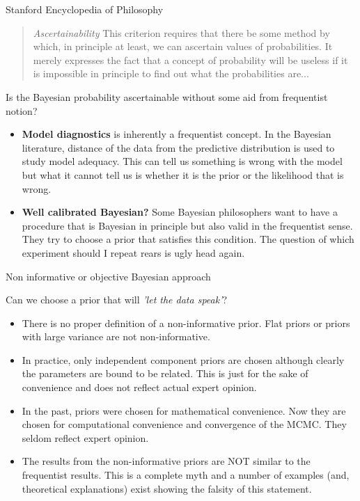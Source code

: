 \documentclass[10pt]{beamer}
\begin{document}
\begin{frame}

Stanford Encyclopedia of Philosophy
\begin{quote}
\textit{Ascertainability} This criterion requires that there be some method by which, in principle at least, we can ascertain values of probabilities. It merely expresses the fact that a concept of probability will be useless if it is impossible in principle to find out what the probabilities are...
\end{quote}
Is the Bayesian probability ascertainable without some aid from frequentist notion? 
\end{frame}

\begin{frame}
\begin{itemize}
\item \textbf {Model diagnostics} is inherently a frequentist concept. In the Bayesian literature, distance of the data from the predictive distribution is used to study model adequacy. This can tell us something is wrong with the model but what it cannot tell us is whether it is the prior or the likelihood that is wrong.  
\pause
\item \textbf {Well calibrated Bayesian?} Some Bayesian philosophers want to have a procedure that is Bayesian in principle but also valid in the frequentist sense. They try to choose a prior that satisfies this condition. The question of which experiment should I repeat rears is ugly head again. 
\end{itemize}
\end{frame}

\begin{frame}
\begin{center}
\alert{\LARGE Non informative or objective Bayesian approach}
\end{center}
Can we choose a prior that will \textit{'let the data speak'}?
\begin{itemize}
\item  There is no proper definition of a non-informative prior. Flat priors or priors with large variance are not non-informative. 
\pause
\item In practice, only independent component priors are chosen although clearly the parameters are bound to be related. This is just for the sake of convenience and does not reflect actual expert opinion.  
\pause
\item In the past, priors were chosen for mathematical convenience. Now they are chosen for computational convenience and convergence of the MCMC. They seldom reflect expert opinion. 
\pause
\item The results from the non-informative priors are NOT similar to the frequentist results. This is a complete myth and a number of examples (and, theoretical explanations) exist showing the falsity of this statement. 
\end{itemize}
\end{frame}
\end{document}
